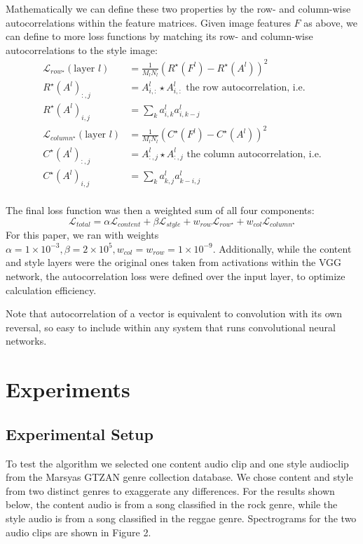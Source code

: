 \documentclass{article}
\begin{document}
Mathematically we can define these two properties by the row- and column-wise autocorrelations within the feature matrices. Given image features $F$ as above, we can define to more loss functions by matching its row- and column-wise autocorrelations to the style image:
\begin{align*}
\mathcal{L}_{row^\star}(\text{layer } l) &= \frac{1}{M_lN_l} (R^\star(F^l) - R^\star(A^l))^2 \\
R^\star(A^l)_{:,j} &= A_{i,:}^l \star A_{i,:}^l \text{ the row autocorrelation, i.e.} \\
R^\star(A^l)_{i,j} &= \sum_k a_{i,k}^la_{i,k-j}^l \\
\mathcal{L}_{column^\star}(\text{layer } l) &= \frac{1}{M_lN_l} (C^\star(F^l) - C^\star(A^l))^2 \\
C^\star(A^l)_{:,j} &= A_{:,j}^l \star A_{:,j}^l \text{ the column autocorrelation, i.e.} \\
C^\star(A^l)_{i,j} &= \sum_k a_{k,j}^la_{k-i,j}^l \\
\end{align*}

The final loss function was then a weighted sum of all four components:
$$
\mathcal{L}_{total} = \alpha \mathcal{L}_{content} + \beta \mathcal{L}_{style} + w_{row} \mathcal{L}_{row^\star} + w_{col} \mathcal{L}_{column^\star}
$$
For this paper, we ran with weights $\alpha = 1\times10^{-3}, \beta = 2\times10^{5}, w_{col} = w_{row} = 1\times10^{-9}$. Additionally, while the content and style layers were the original ones taken from activations within the VGG network, the autocorrelation loss were defined over the input layer, to optimize calculation efficiency.

Note that autocorrelation of a vector is equivalent to convolution with its own reversal, so easy to include within any system that runs convolutional neural networks.

\section{Experiments}

\subsection{Experimental Setup}

To test the algorithm we selected one content audio clip and one style audioclip from the Marsyas GTZAN genre collection database. We chose content and style from two distinct genres to exaggerate any differences. For the results shown below, the content audio is from a song classified in the rock genre, while the style audio is from a song classified in the reggae genre. Spectrograms for the two audio clips are shown in Figure 2.
\end{document}
